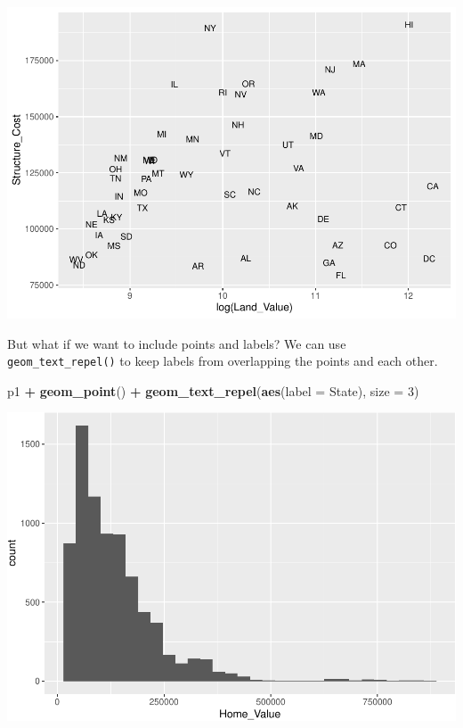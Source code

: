 \documentclass[
]{book}
\newenvironment{Shaded}{\begin{snugshade}}{\end{snugshade}}
\newcommand{\DataTypeTok}[1]{\textcolor[rgb]{0.13,0.29,0.53}{#1}}
\newcommand{\DecValTok}[1]{\textcolor[rgb]{0.00,0.00,0.81}{#1}}
\newcommand{\KeywordTok}[1]{\textcolor[rgb]{0.13,0.29,0.53}{\textbf{#1}}}
\newcommand{\NormalTok}[1]{#1}
\newcommand{\OperatorTok}[1]{\textcolor[rgb]{0.81,0.36,0.00}{\textbf{#1}}}
\newcommand{\StringTok}[1]{\textcolor[rgb]{0.31,0.60,0.02}{#1}}
\begin{document}
\includegraphics{R/Rgraphics/figures/unnamed-chunk-159-1.pdf}

But what if we want to include points and labels? We can use \texttt{geom\_text\_repel()} to keep labels from overlapping the points and each other.

\begin{Shaded}
\begin{Highlighting}[]
\NormalTok{p1 }\OperatorTok{+}\StringTok{ }
\StringTok{  }\KeywordTok{geom\_point}\NormalTok{() }\OperatorTok{+}\StringTok{ }
\StringTok{  }\KeywordTok{geom\_text\_repel}\NormalTok{(}\KeywordTok{aes}\NormalTok{(}\DataTypeTok{label =}\NormalTok{ State), }\DataTypeTok{size =} \DecValTok{3}\NormalTok{)}
\end{Highlighting}
\end{Shaded}

\includegraphics{R/Rgraphics/figures/unnamed-chunk-160-1.pdf}
\end{document}

